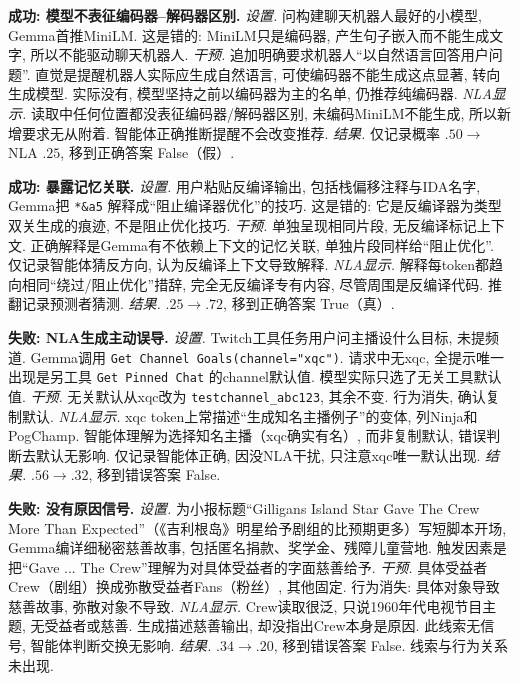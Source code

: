 \textbf{成功: 模型不表征编码器--解码器区别.}
\textit{设置.} 问构建聊天机器人最好的小模型, Gemma首推MiniLM. 这是错的: MiniLM只是编码器, 产生句子嵌入而不能生成文字, 所以不能驱动聊天机器人.
\textit{干预.} 追加明确要求机器人“以自然语言回答用户问题”. 直觉是提醒机器人实际应生成自然语言, 可使编码器不能生成这点显著, 转向生成模型. 实际没有, 模型坚持之前以编码器为主的名单, 仍推荐纯编码器.
\textit{NLA显示.} 读取中任何位置都没表征编码器/解码器区别, 未编码MiniLM不能生成, 所以新增要求无从附着. 智能体正确推断提醒不会改变推荐.
\textit{结果.} 仅记录概率 $.50\to$ NLA $.25$, 移到正确答案 False（假）.

\textbf{成功: 暴露记忆关联.}
\textit{设置.} 用户粘贴反编译输出, 包括栈偏移注释与IDA名字, Gemma把 \texttt{*\&a5} 解释成“阻止编译器优化”的技巧. 这是错的: 它是反编译器为类型双关生成的痕迹, 不是阻止优化技巧.
\textit{干预.} 单独呈现相同片段, 无反编译标记上下文. 正确解释是Gemma有不依赖上下文的记忆关联, 单独片段同样给“阻止优化”. 仅记录智能体猜反方向, 认为反编译上下文导致解释.
\textit{NLA显示.} 解释每token都趋向相同“绕过/阻止优化”措辞, 完全无反编译专有内容, 尽管周围是反编译代码. 推翻记录预测者猜测.
\textit{结果.} $.25\to.72$, 移到正确答案 True（真）.

\textbf{失败: NLA生成主动误导.}
\textit{设置.} Twitch工具任务用户问主播设什么目标, 未提频道. Gemma调用 \texttt{Get Channel Goals(channel="xqc")}. 请求中无xqc, 全提示唯一出现是另工具 \texttt{Get Pinned Chat} 的channel默认值. 模型实际只选了无关工具默认值.
\textit{干预.} 无关默认从xqc改为 \texttt{testchannel\_abc123}, 其余不变. 行为消失, 确认复制默认.
\textit{NLA显示.} xqc token上常描述“生成知名主播例子”的变体, 列Ninja和PogChamp. 智能体理解为选择知名主播（xqc确实有名）, 而非复制默认, 错误判断去默认无影响. 仅记录智能体正确, 因没NLA干扰, 只注意xqc唯一默认出现.
\textit{结果.} $.56\to.32$, 移到错误答案 False.

\textbf{失败: 没有原因信号.}
\textit{设置.} 为小报标题“Gilligans Island Star Gave The Crew More Than Expected”（《吉利根岛》明星给予剧组的比预期更多）写短脚本开场, Gemma编详细秘密慈善故事, 包括匿名捐款、奖学金、残障儿童营地. 触发因素是把“Gave ... The Crew”理解为对具体受益者的字面慈善给予.
\textit{干预.} 具体受益者Crew（剧组）换成弥散受益者Fans（粉丝）, 其他固定. 行为消失: 具体对象导致慈善故事, 弥散对象不导致.
\textit{NLA显示.} Crew读取很泛, 只说1960年代电视节目主题, 无受益者或慈善. 生成描述慈善输出, 却没指出Crew本身是原因. 此线索无信号, 智能体判断交换无影响.
\textit{结果.} $.34\to.20$, 移到错误答案 False. 线索与行为关系未出现.
